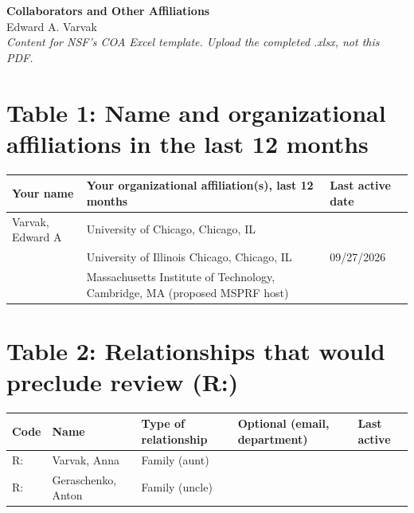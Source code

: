 \documentclass[11pt]{article}
\begin{document}
\begin{center}
  {\Large\bfseries Collaborators and Other Affiliations}\\[5pt]
  Edward A. Varvak\\[3pt]
  \emph{Content for NSF's COA Excel template. Upload the completed .xlsx, not this PDF.}
\end{center}

\section*{Table 1: Name and organizational affiliations in the last 12 months}

\begin{tabularx}{\textwidth}{@{}lXl@{}}
\toprule
Your name & Your organizational affiliation(s), last 12 months & Last active date \\
\midrule
Varvak, Edward A & University of Chicago, Chicago, IL & \\
 & University of Illinois Chicago, Chicago, IL & 09/27/2026 \\
 & Massachusetts Institute of Technology, Cambridge, MA (proposed MSPRF host) & \\
\bottomrule
\end{tabularx}

\section*{Table 2: Relationships that would preclude review (R:)}

\begin{tabularx}{\textwidth}{@{}llXll@{}}
\toprule
Code & Name & Type of relationship & Optional (email, department) & Last active \\
\midrule
R: & Varvak, Anna & Family (aunt) & & \\
R: & Geraschenko, Anton & Family (uncle) & & \\
\bottomrule
\end{tabularx}
\end{document}
